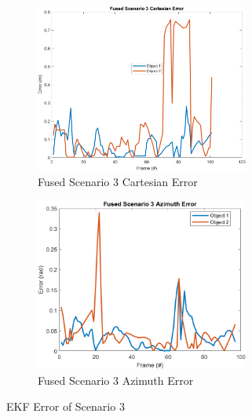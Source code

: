 \begin{figure}[!htb]
    \hspace{0.1\textwidth}
    \begin{subfigure}[b]{0.35\textwidth}%
        \includegraphics[width=7cm]{Figures/matlab/Fused Scenario 3 Cartesian Error.png}
        \caption{Fused Scenario 3 Cartesian Error}
        \label{subfig:err_cart_3}
    \end{subfigure}
    \hspace{0.15\textwidth}
    \begin{subfigure}[b]{0.35\textwidth}%
        \includegraphics[width=7cm]{Figures/matlab/Fused Scenario 3 Azimuth Error.png}
        \caption{Fused Scenario 3 Azimuth Error}
        \label{subfig:err_azi_3}
    \end{subfigure}

    \caption{EKF Error of Scenario 3}
    \label{fig:error_3}
\end{figure}